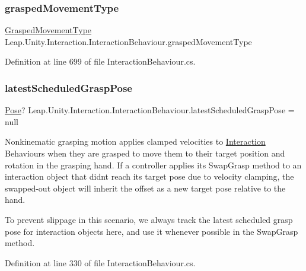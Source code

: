 \subsubsection{\texorpdfstring{graspedMovementType}{graspedMovementType}}
{\footnotesize\ttfamily \mbox{\hyperlink{class_leap_1_1_unity_1_1_interaction_1_1_interaction_behaviour_a800262cc3a5c425a4816b60fae89c307}{Grasped\+Movement\+Type}} Leap.\+Unity.\+Interaction.\+Interaction\+Behaviour.\+grasped\+Movement\+Type}



Definition at line 699 of file Interaction\+Behaviour.\+cs.

\mbox{\label{class_leap_1_1_unity_1_1_interaction_1_1_interaction_behaviour_a0073161fe1a5a4cd29b71a203fc6b2c5}} 
\subsubsection{\texorpdfstring{latestScheduledGraspPose}{latestScheduledGraspPose}}
{\footnotesize\ttfamily \mbox{\hyperlink{struct_leap_1_1_unity_1_1_pose}{Pose}}? Leap.\+Unity.\+Interaction.\+Interaction\+Behaviour.\+latest\+Scheduled\+Grasp\+Pose = null}



Nonkinematic grasping motion applies clamped velocities to \mbox{\hyperlink{namespace_leap_1_1_unity_1_1_interaction}{Interaction}} Behaviours when they are grasped to move them to their target position and rotation in the grasping hand. If a controller applies its Swap\+Grasp method to an interaction object that didn\textquotesingle{}t reach its target pose due to velocity clamping, the swapped-\/out object will inherit the offset as a new target pose relative to the hand. 

To prevent slippage in this scenario, we always track the latest scheduled grasp pose for interaction objects here, and use it whenever possible in the Swap\+Grasp method. 

Definition at line 330 of file Interaction\+Behaviour.\+cs.

\mbox{\label{class_leap_1_1_unity_1_1_interaction_1_1_interaction_behaviour_ae7d4d7f9e7e7a619e26508bb023ae22d}} 
